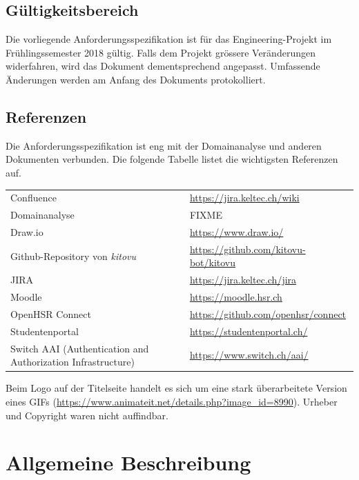 \documentclass[a4paper]{article}
\let\oldsection\section
\renewcommand\section{\clearpage\oldsection}
\def\jiraurl{https://jira.keltec.ch/jira}
\def\confluenceurl{https://jira.keltec.ch/wiki}
\begin{document}
\subsection{Gültigkeitsbereich}
Die vorliegende Anforderungsspezifikation ist für das Engineering-Projekt im Frühlingssemester 2018 gültig. Falls dem Projekt grössere Veränderungen widerfahren, wird das Dokument dementsprechend angepasst. Umfassende Änderungen werden am Anfang des Dokuments protokolliert.

\subsection{Referenzen}


Die Anforderungsspezifikation ist eng mit der Domainanalyse und anderen Dokumenten verbunden. Die folgende Tabelle listet die wichtigsten Referenzen auf.

\begin{tabulary}{\linewidth}{ll}
	Confluence & \url{\confluenceurl} \\
	Domainanalyse & FIXME \\
	Draw.io & \url{https://www.draw.io/} \\
	Github-Repository von \emph{kitovu} & \url{https://github.com/kitovu-bot/kitovu} \\
	JIRA	& \url{\jiraurl} \\
	Moodle & \url{https://moodle.hsr.ch} \\
	OpenHSR Connect & \url{https://github.com/openhsr/connect} \\
	Studentenportal & \url{https://studentenportal.ch/} \\
	Switch AAI (Authentication and Authorization Infrastructure)& \url{https://www.switch.ch/aai/} \\
	
\end{tabulary}

Beim Logo auf der Titelseite handelt es sich um eine stark überarbeitete Version eines GIFs (\url{https://www.animateit.net/details.php?image_id=8990}). Urheber und Copyright waren nicht auffindbar.

\pagebreak
\section{Allgemeine Beschreibung}
\end{document}
